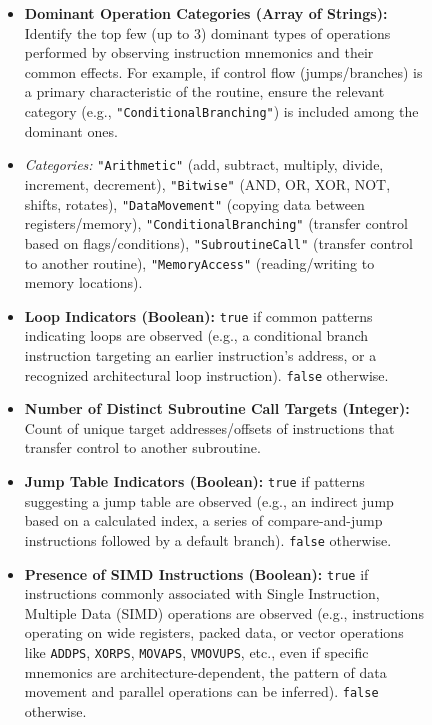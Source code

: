 \begin{figure}
{\begin{minipage}{0.95\textwidth}
    \begin{itemize}
    \item \textbf{Dominant Operation Categories (Array of Strings):} Identify the top few (up to 3) dominant types of operations performed by observing instruction mnemonics and their common effects. For example, if control flow (jumps/branches) is a primary characteristic of the routine, ensure the relevant category (e.g., \texttt{"ConditionalBranching"}) is included among the dominant ones.
    \item \textit{Categories:} \texttt{"Arithmetic"} (add, subtract, multiply, divide, increment, decrement), \texttt{"Bitwise"} (AND, OR, XOR, NOT, shifts, rotates), \texttt{"DataMovement"} (copying data between registers/memory), \texttt{"ConditionalBranching"} (transfer control based on flags/conditions), \texttt{"SubroutineCall"} (transfer control to another routine), \texttt{"MemoryAccess"} (reading/writing to memory locations).
    \item \textbf{Loop Indicators (Boolean):} \texttt{true} if common patterns indicating loops are observed (e.g., a conditional branch instruction targeting an earlier instruction's address, or a recognized architectural loop instruction). \texttt{false} otherwise.
    \item \textbf{Number of Distinct Subroutine Call Targets (Integer):} Count of unique target addresses/offsets of instructions that transfer control to another subroutine.
    \item \textbf{Jump Table Indicators (Boolean):} \texttt{true} if patterns suggesting a jump table are observed (e.g., an indirect jump based on a calculated index, a series of compare-and-jump instructions followed by a default branch). \texttt{false} otherwise.
    \item \textbf{Presence of SIMD Instructions (Boolean):} \texttt{true} if instructions commonly associated with Single Instruction, Multiple Data (SIMD) operations are observed (e.g., instructions operating on wide registers, packed data, or vector operations like \texttt{ADDPS}, \texttt{XORPS}, \texttt{MOVAPS}, \texttt{VMOVUPS}, etc., even if specific mnemonics are architecture-dependent, the pattern of data movement and parallel operations can be inferred). \texttt{false} otherwise.
    \end{itemize}
 

\end{minipage}}
\end{figure}
